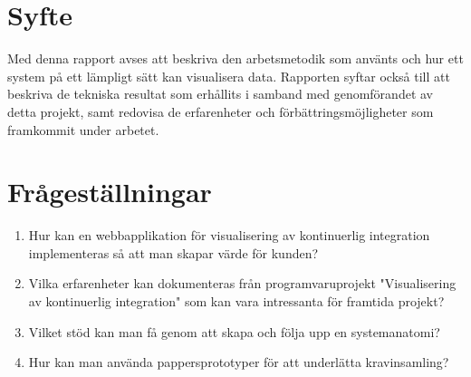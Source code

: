 \section{Syfte}
\label{sec:purpose}
Med denna rapport avses att beskriva den arbetsmetodik som använts och hur ett system på ett lämpligt sätt kan visualisera data. Rapporten syftar också till att beskriva de tekniska resultat som erhållits i samband med genomförandet av detta projekt, samt redovisa de erfarenheter och förbättringsmöjligheter som framkommit under arbetet.

\section{Frågeställningar}
\label{sec:research-questions}



\begin{enumerate}
\item Hur kan en webbapplikation för visualisering av kontinuerlig integration implementeras så att man skapar värde för kunden?
\item Vilka erfarenheter kan dokumenteras från programvaruprojekt "Visualisering av kontinuerlig
integration" som kan vara intressanta för framtida projekt?
\item Vilket stöd kan man få genom att skapa och följa upp en systemanatomi?
\item Hur kan man använda pappersprototyper för att underlätta kravinsamling? %





\end{enumerate}


